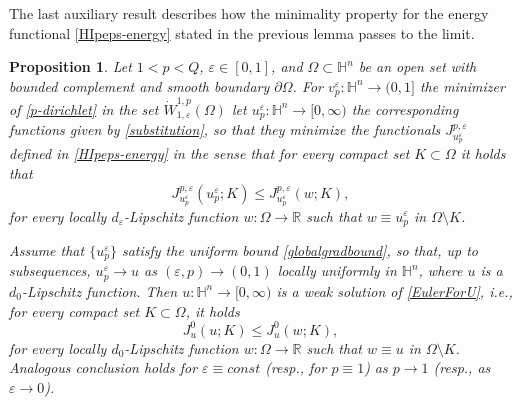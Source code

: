 \documentclass[10pt]{amsart}
\numberwithin{equation}{section}
\newtheorem{proposition}[theorem]{Proposition}
\theoremstyle{definition}
\newcommand{\He}{\mathbb{H}}
\begin{document}
The last auxiliary result describes how the minimality property for the energy functional \eqref{HIpeps-energy} stated in the previous lemma passes to the limit. 

\begin{proposition}
\label{limiting-minimality}
	Let  $1<p<Q$, $\varepsilon \in [0,1]$, and $\Omega \subset \He^n$ be an open set with bounded complement and smooth boundary $\partial \Omega$. For $v^\varepsilon_p:\He^n \to (0,1]$ the minimizer of \eqref{p-dirichlet} in the set $\dot{W}
^{1,p}_{1, \varepsilon} (\Omega)$ let $u^\varepsilon_p: \He^n \to [0,\infty)$ the corresponding functions given by \eqref{substitution}, so that 
they minimize the functionals $J^{p,\varepsilon}_{u^\varepsilon_p}$ defined in \eqref{HIpeps-energy}
 in the sense that for every compact set $K \subset \Omega$ it holds that
\begin{equation}\label{eq:u_pMinimizer}
J_{u_p^{\varepsilon}}^{p,\varepsilon}(u_p^{\varepsilon};K) \leq J_{u_p^{\varepsilon}}^{p,\varepsilon}(w;K),
\end{equation}
\noindent for every locally $d_{\varepsilon}$-Lipschitz function $w:\Omega \to \mathbb{R}$ such that $w\equiv u_{p}^{\varepsilon}$ in $\Omega \setminus K$.

Assume that $\{ u^\varepsilon_p\}$ satisfy the uniform bound \eqref{globalgradbound}, so that, up to subsequences, $u_{p}^{\varepsilon} \to u$ as $(\varepsilon,p) \to (0,1)$ locally uniformly in $\He^n$, where $u$ is a $d_0$-Lipschitz function. Then $u:\He^n \to [0,\infty)$ is a weak solution of \eqref{EulerForU}, i.e., for every compact set $K\subset \Omega$, it holds
\begin{equation}\label{eq:u_solution}
J^{0}_{u}(u;K) \leq J^{0}_{u}(w;K),
\end{equation}
\noindent for every locally $d_{0}$-Lipschitz function $w:\Omega \to \mathbb{R}$ such that $w \equiv u$ in $\Omega \setminus K$. Analogous conclusion holds for $\varepsilon \equiv const$ (resp., for $p \equiv 1$) as $p\to 1$ (resp., as $\varepsilon \to 0$).
\end{proposition}
\end{document}
